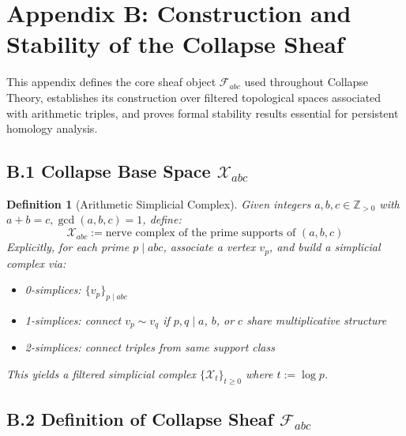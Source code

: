 \documentclass[11pt]{article}
\newtheorem{definition}[theorem]{Definition}
\begin{document}
\section*{Appendix B: Construction and Stability of the Collapse Sheaf}

This appendix defines the core sheaf object \( \mathcal{F}_{abc} \) used throughout Collapse Theory,  
establishes its construction over filtered topological spaces associated with arithmetic triples,  
and proves formal stability results essential for persistent homology analysis.

\subsection*{B.1 Collapse Base Space \( \mathcal{X}_{abc} \)}

\begin{definition}[Arithmetic Simplicial Complex]
Given integers \( a, b, c \in \mathbb{Z}_{>0} \) with \( a + b = c, \gcd(a,b,c)=1 \), define:
\[
\mathcal{X}_{abc} := \text{nerve complex of the prime supports of } (a,b,c)
\]
Explicitly, for each prime \( p \mid abc \), associate a vertex \( v_p \), and build a simplicial complex via:
\begin{itemize}
  \item 0-simplices: \( \{ v_p \}_{p \mid abc} \)
  \item 1-simplices: connect \( v_p \sim v_q \) if \( p,q \mid a \), \( b \), or \( c \) share multiplicative structure
  \item 2-simplices: connect triples from same support class
\end{itemize}
This yields a filtered simplicial complex \( \{ \mathcal{X}_t \}_{t \geq 0} \) where \( t := \log p \).
\end{definition}

\subsection*{B.2 Definition of Collapse Sheaf \( \mathcal{F}_{abc} \)}
\end{document}
